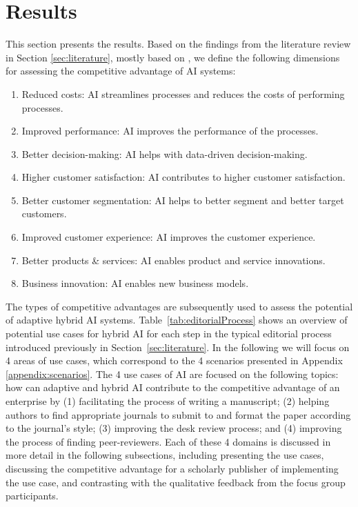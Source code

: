 \section{Results}
\label{sec:results}

This section presents the results. Based on the findings from the literature review in Section \ref{sec:literature},
mostly based on \citet{iansitiCompetingAgeAI2020,hoArtificialIntelligenceFirm2022}, we define the following dimensions
for assessing the competitive advantage of AI systems:

\begin{enumerate}
    \item Reduced costs: AI streamlines processes and reduces the costs of performing processes.
    \item Improved performance: AI improves the performance of the processes.
    \item Better decision-making: AI helps with data-driven decision-making.
    \item Higher customer satisfaction: AI contributes to higher customer satisfaction.
    \item Better customer segmentation: AI helps to better segment and better target customers.
    \item Improved customer experience: AI improves the customer experience.
    \item Better products \& services: AI enables product and service innovations.
    \item Business innovation: AI enables new business models.
\end{enumerate}

\vspace{0.4cm}

\noindent The types of competitive advantages are subsequently used to assess the potential of adaptive hybrid AI systems.
Table~\ref{tab:editorialProcess} shows an overview of potential use cases for hybrid AI for each step in the typical editorial process
introduced previously in Section~\ref{sec:literature}. In the following we will focus on 4 areas of use cases, which correspond to the 
4 scenarios presented in Appendix \ref{appendix:scenarios}. The 4 use cases of AI are focused on the following topics: how can adaptive
and hybrid AI contribute to the competitive advantage of an enterprise by (1) facilitating the process of writing a manuscript; (2) helping
authors to find appropriate journals to submit to and format the paper according to the journal's style; (3) improving the desk
review process; and (4) improving the process of finding peer-reviewers. Each of these 4 domains is discussed in more detail in the
following subsections, including presenting the use cases, discussing the competitive advantage for a scholarly publisher of
implementing the use case, and contrasting with the qualitative feedback from the focus group participants.

